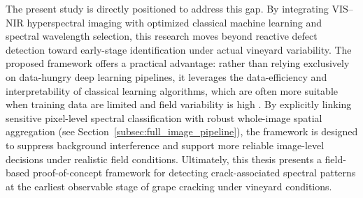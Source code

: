 \medskip
\noindent
The present study is directly positioned to address this gap. By integrating VIS--NIR hyperspectral imaging with optimized classical machine learning and spectral wavelength selection, this research moves beyond reactive defect detection toward early-stage identification under actual vineyard variability. The proposed framework offers a practical advantage: rather than relying exclusively on data-hungry deep learning pipelines, it leverages the data-efficiency and interpretability of classical learning algorithms, which are often more suitable when training data are limited and field variability is high \parencite{paoletti2019deep, benos2021machine}. By explicitly linking sensitive pixel-level spectral classification with robust whole-image spatial aggregation (see Section~\ref{subsec:full_image_pipeline}), the framework is designed to suppress background interference and support more reliable image-level decisions under realistic field conditions. Ultimately, this thesis presents a field-based proof-of-concept framework for detecting crack-associated spectral patterns at the earliest observable stage of grape cracking under vineyard conditions.